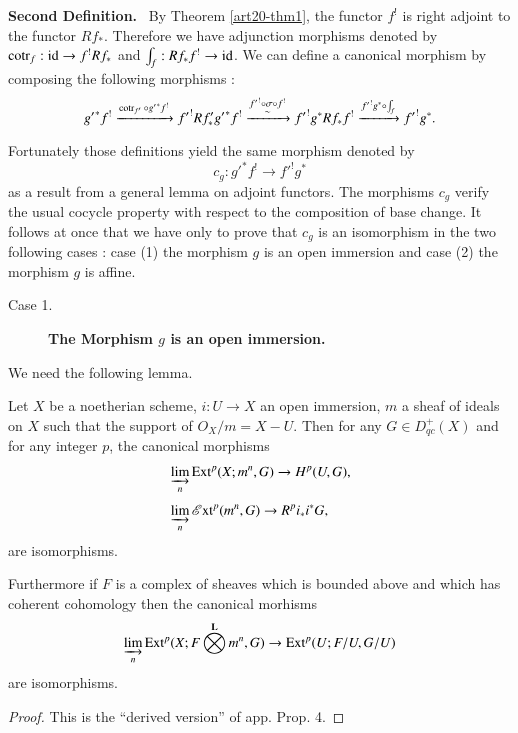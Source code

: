 \noindent
{\bf Second Definition.}~ By Theorem \ref{art20-thm1}, the functor $f^{!}$ is right adjoint to the functor $Rf_{*}$. Therefore we have adjunction morphisms denoted by $\operatorname{\mathrm{cotr}}_{f}:\operatorname{\mathrm{id}}\to f^{!}Rf_{*}$ and $\int_{f}:Rf_{*}f^{!}\to \operatorname{\mathrm{id}}$. We can define a canonical morphism by composing the following morphisms :
$$
{g'}^{*}f^{!}\xrightarrow{\operatorname{\mathrm{cotr}}_{f'}\circ {g'}^{*}f^{!}}{f'}^{!}Rf'_{*}{g'}^{*}f^{!}\xrightarrow{\substack{{f'}^{!}\circ \sigma \circ f^{!}\\ \sim}} {f'}^{!}g^{*}Rf_{*}f^{!}
\xrightarrow{{f'}^{!}g^{*}\circ \int_{f}}{f'}^{!}g^{*}.
$$

Fortunately those definitions yield the same morphism denoted by
$$
c_{g}:{g'}^{*}f^{!}\to {f'}^{!}g^{*}
$$
as a result from a general lemma on adjoint functors. The morphisms $c_{g}$ verify the usual cocycle property with respect to the composition of base change. It follows at once that we have only to prove that $c_{g}$ is an isomorphism in the two following cases : case (1) the morphism $g$ is an open immersion and case (2) the morphism $g$ is affine.
\begin{description}
\item[Case 1.] {\bf The Morphism \boldmath$g$ is an open immersion.}
\end{description}

We need the following lemma.

\begin{lemma}\label{art20-sec2-lem2}
Let $X$ be a noetherian scheme, $i:U\to X$ an open immersion, $m$ a sheaf of ideals on $X$ such that the support of $O_{X}/m=X-U$. Then for any $G\in D^{+}_{qc}(X)$ and for any integer $p$, the canonical morphisms
\begin{align*}
& \varinjlim_{n} \operatorname{\mathrm{Ext}}^{p}(X;m^{n},G)\to H^{p}(U,G),\\[3pt]
& \varinjlim_{n}\operatorname{\mathscr{E}\mathrm{xt}}^{p}(m^{n},G)\to R^{p}i_{*}i^{*}G,
\end{align*}\pageoriginale
are isomorphisms.

Furthermore if $F$ is a complex of sheaves which is bounded above and which has coherent cohomology then the canonical morhisms
$$
\varinjlim_{n}\operatorname{\mathrm{Ext}}^{p}(X;F\bigotimes\limits^{\mathbf{L}}m^{n},G)\to \operatorname{\mathrm{Ext}}^{p}(U;F/U,G/U)
$$
are isomorphisms.
\end{lemma}

\begin{proof}
This is the ``derived version'' of \cite{art20-key1} app. Prop. 4.
\end{proof}

